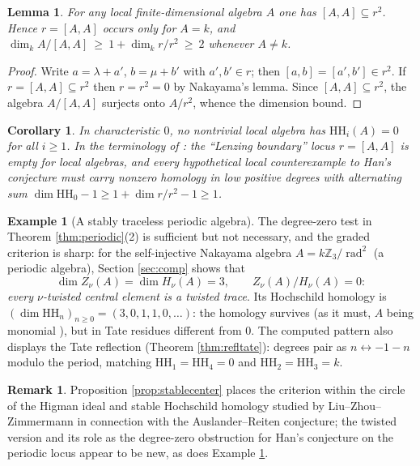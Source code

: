\documentclass[11pt]{amsart}
\newtheorem{lemma}[theorem]{Lemma}
\newtheorem{corollary}[theorem]{Corollary}
\theoremstyle{definition}
\newtheorem{example}[theorem]{Example}
\newtheorem{remark}[theorem]{Remark}
\newcommand{\HH}{\mathrm{HH}}
\newcommand{\rad}{\operatorname{rad}}
\newcommand{\kk}{k}
\begin{document}
\begin{lemma}\label{lem:local}
For any local finite-dimensional algebra $A$ one has $[A,A]\subseteq r^2$.
Hence $r=[A,A]$ occurs only for $A=\kk$, and
$\dim_\kk A/[A,A]\ \ge\ 1+\dim_\kk r/r^2\ \ge\ 2$ whenever $A\neq\kk$.
\end{lemma}

\begin{proof}
Write $a=\lambda+a'$, $b=\mu+b'$ with $a',b'\in r$; then
$[a,b]=[a',b']\in r^2$. If $r=[A,A]\subseteq r^2$ then $r=r^2=0$ by
Nakayama's lemma. Since $[A,A]\subseteq r^2$, the algebra $A/[A,A]$ surjects onto $A/r^2$, whence the dimension bound.
\end{proof}

\begin{corollary}\label{cor:lenzing}
In characteristic $0$, no nontrivial local algebra has $\HH_i(A)=0$ for all
$i\ge1$. In the terminology of \cite[Corollary 5.5]{ArmPC}: the ``Lenzing
boundary'' locus $r=[A,A]$ is empty for local algebras, and every
hypothetical local counterexample to Han's conjecture must carry nonzero
homology in low positive degrees with alternating sum
$\dim\HH_0-1\ge1+\dim r/r^2-1\ge1$.
\end{corollary}

\begin{example}[A stably traceless periodic algebra]\label{ex:traceless}
The degree-zero test in Theorem \ref{thm:periodic}(2) is sufficient but not
necessary, and the graded criterion is sharp: for the self-injective Nakayama
algebra $A=\kk\mathbb Z_3/\rad^2$ (a periodic algebra), Section
\ref{sec:comp} shows that
\[
\dim Z_\nu(A)=\dim H_\nu(A)=3,\qquad Z_\nu(A)/H_\nu(A)=0:
\]
\emph{every $\nu$-twisted central element is a twisted trace}. Its Hochschild
homology is $(\dim\HH_n)_{n\ge0}=(3,0,1,1,0,\dots)$: the homology survives
(as it must, $A$ being monomial \cite{Han06}), but in Tate residues
different from $0$. The computed pattern also displays the Tate reflection
(Theorem \ref{thm:refltate}): degrees pair as $n\leftrightarrow-1-n$ modulo
the period, matching $\HH_1=\HH_4=0$ and $\HH_2=\HH_3=\kk$.
\end{example}

\begin{remark}
Proposition \ref{prop:stablecenter} places the criterion within the circle of
the Higman ideal and stable Hochschild homology studied by
Liu--Zhou--Zimmermann \cite{LZZ-Higman} in connection with the
Auslander--Reiten conjecture; the twisted version and its role as the
degree-zero obstruction for Han's conjecture on the periodic locus appear to
be new, as does Example \ref{ex:traceless}.
\end{remark}
\end{document}
